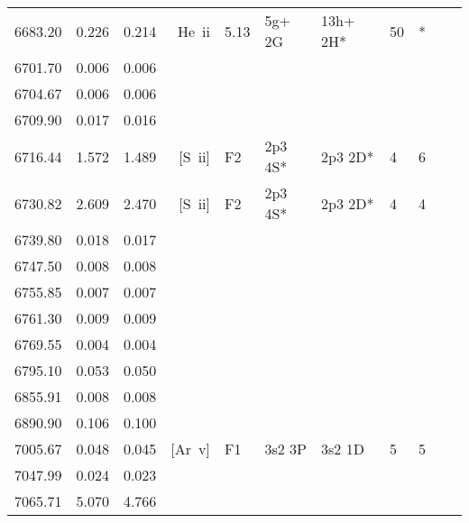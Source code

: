 \begin{longtable}{lrlrlllllll}
 6683.20 &   0.226 &   0.214 &  He~{\sc ii}     &  5.13      &  5g+ 2G    &  13h+ 2H*  &         50 &        *    \\
 6701.70 &   0.006 &   0.006                                                                                      \\
 6704.67 &   0.006 &   0.006                                                                                      \\
 6709.90 &   0.017 &   0.016                                                                                      \\
 6716.44 &   1.572 &   1.489 &  [S~{\sc ii}]    &  F2        &  2p3 4S*   &  2p3 2D*   &          4 &        6    \\
 6730.82 &   2.609 &   2.470 &  [S~{\sc ii}]    &  F2        &  2p3 4S*   &  2p3 2D*   &          4 &        4    \\
 6739.80 &   0.018 &   0.017                                                                                      \\
 6747.50 &   0.008 &   0.008                                                                                      \\
 6755.85 &   0.007 &   0.007                                                                                      \\
 6761.30 &   0.009 &   0.009                                                                                      \\
 6769.55 &   0.004 &   0.004                                                                                      \\
 6795.10 &   0.053 &   0.050                                                                                      \\
 6855.91 &   0.008 &   0.008                                                                                      \\
 6890.90 &   0.106 &   0.100                                                                                      \\
 7005.67 &   0.048 &   0.045 &  [Ar~{\sc v}]    &  F1        &  3s2 3P    &  3s2 1D    &          5 &        5    \\
 7047.99 &   0.024 &   0.023                                                                                      \\
 7065.71 &   5.070 &   4.766                                                                                      \\

\end{longtable}
